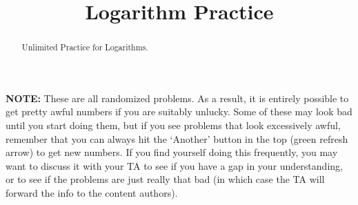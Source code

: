 \documentclass{ximeraXloud}
\title{Logarithm Practice}
\begin{document}
\begin{abstract}
    Unlimited Practice for Logarithms.
\end{abstract}
\maketitle

\textbf{NOTE:} These are all randomized problems. As a result, it is entirely possible to get pretty awful numbers if you are suitably unlucky. Some of these may look bad until you start doing them, but if you see problems that look excessively awful, remember that you can always hit the `Another' button in the top (green refresh arrow) to get new numbers. If you find yourself doing this frequently, you may want to discuss it with your TA to see if you have a gap in your understanding, or to see if the problems are just really that bad (in which case the TA will forward the info to the content authors).

%
\end{document}
